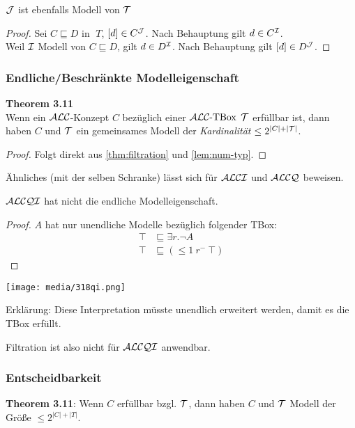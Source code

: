 \begin{tafel}
$\mathcal{J}$ ist ebenfalls Modell von $\mathcal{T}$
\begin{proof}
Sei $C \sqsubseteq D$ in $\;T$, $[d] \in C^{\mathcal{J}}$.
Nach Behauptung gilt $d \in C^{\mathcal{I}}$. \\
Weil $\mathcal{I}$ Modell von $C \sqsubseteq D$, gilt $d \in D^{\mathcal{I}}$.
Nach Behauptung gilt $[d] \in D^{\mathcal{J}}$.
\end{proof}
\end{tafel}

\subsubsection{Endliche/Beschränkte Modelleigenschaft}

\textbf{Theorem 3.11} \\
Wenn ein $\mathcal{A}\mathcal{L}\mathcal{C}$-Konzept $C$ bezüglich einer $\text{$\mathcal{A}\mathcal{L}\mathcal{C}$-TBox}$ $\mathcal{T}$ erfüllbar ist, dann haben $C$ und $\mathcal{T}$ ein gemeinsames Modell der
\emph{Kardinalität} $\leq 2^{\left| C \right| + |\MT|}$.

\begin{proof}
    Folgt direkt aus \autoref{thm:filtration} und \autoref{lem:num-typ}.
\end{proof}

Ähnliches (mit der selben Schranke) lässt sich für $\mathcal{A}\mathcal{L}\mathcal{C}\mathcal{I}$ und $\mathcal{A}\mathcal{L}\mathcal{C}\mathcal{Q}$ beweisen.

\begin{theorem}
$\mathcal{A}\mathcal{L}\mathcal{C}\mathcal{Q}\mathcal{I}$ hat nicht die endliche Modelleigenschaft.
\end{theorem}

\begin{proof}
    $A$ hat nur unendliche Modelle bezüglich folgender TBox:
    \begin{align*}
        \top &\sqsubseteq \exists r.\neg A\\
        \top &\sqsubseteq ( \leq 1\ r^{-}\ \top)
    \end{align*}
\end{proof}
\begin{tafel}\mbox{}

\texttt{[image: media/318qi.png]}

Erklärung: Diese Interpretation müsste unendlich erweitert werden, damit es die TBox erfüllt.
\end{tafel}

Filtration ist also nicht für $\mathcal{A}\mathcal{L}\mathcal{C}\mathcal{Q}\mathcal{I}$ anwendbar.

\subsubsection{Entscheidbarkeit}
\textbf{Theorem 3.11}:
Wenn $C$ erfüllbar bzgl. $\mathcal{T}$, dann haben $C$ und $\mathcal{T}$ Modell der
Größe $\leq 2^{\left| C \right| + \left| T \right|}$.

